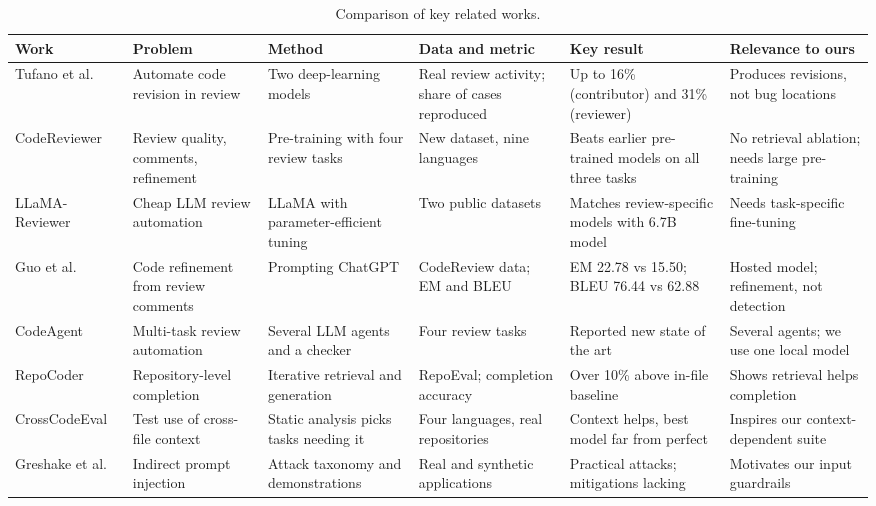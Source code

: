 \documentclass[12pt,onecolumn,draftclsnofoot]{IEEEtran}
\begin{document}
\begin{table}[!t]
\caption{Comparison of key related works.}\label{tab:related}
\centering\scriptsize\setlength{\tabcolsep}{3pt}
\renewcommand{\arraystretch}{1.15}
\begin{tabular}{@{}p{0.72in}p{0.92in}p{1.0in}p{1.0in}p{1.0in}p{1.2in}@{}}
\toprule
Work & Problem & Method & Data and metric & Key result & Relevance to ours \\
\midrule
Tufano et al.~\cite{tufano2021towards} & Automate code revision in review & Two deep-learning models & Real review activity; share of cases reproduced & Up to 16\% (contributor) and 31\% (reviewer) & Produces revisions, not bug locations \\
CodeReviewer~\cite{li2022codereviewer} & Review quality, comments, refinement & Pre-training with four review tasks & New dataset, nine languages & Beats earlier pre-trained models on all three tasks & No retrieval ablation; needs large pre-training \\
LLaMA-Reviewer~\cite{lu2023llamareviewer} & Cheap LLM review automation & LLaMA with parameter-efficient tuning & Two public datasets & Matches review-specific models with 6.7B model & Needs task-specific fine-tuning \\
Guo et al.~\cite{guo2023chatgpt} & Code refinement from review comments & Prompting ChatGPT & CodeReview data; EM and BLEU & EM 22.78 vs 15.50; BLEU 76.44 vs 62.88 & Hosted model; refinement, not detection \\
CodeAgent~\cite{tang2024codeagent} & Multi-task review automation & Several LLM agents and a checker & Four review tasks & Reported new state of the art & Several agents; we use one local model \\
RepoCoder~\cite{zhang2023repocoder} & Repository-level completion & Iterative retrieval and generation & RepoEval; completion accuracy & Over 10\% above in-file baseline & Shows retrieval helps completion \\
CrossCodeEval~\cite{ding2023crosscodeeval} & Test use of cross-file context & Static analysis picks tasks needing it & Four languages, real repositories & Context helps, best model far from perfect & Inspires our context-dependent suite \\
Greshake et al.~\cite{greshake2023indirect} & Indirect prompt injection & Attack taxonomy and demonstrations & Real and synthetic applications & Practical attacks; mitigations lacking & Motivates our input guardrails \\
\bottomrule
\end{tabular}
\end{table}
\end{document}
